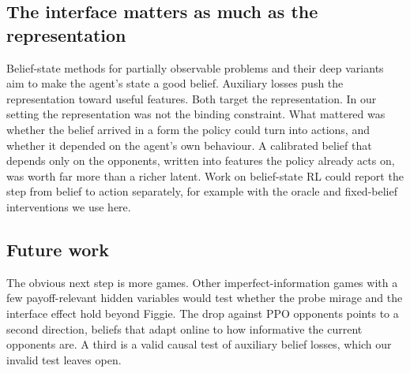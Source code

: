 \documentclass{article}
\begin{document}
\subsection{The interface matters as much as the representation}
Belief-state methods for partially observable problems \cite{kaelbling1998pomdp} and their deep variants \cite{hausknecht2015drqn,igl2018dvrl} aim to make the agent's state a good belief. Auxiliary losses \cite{jaderberg2017unreal} push the representation toward useful features. Both target the representation. In our setting the representation was not the binding constraint. What mattered was whether the belief arrived in a form the policy could turn into actions, and whether it depended on the agent's own behaviour. A calibrated belief that depends only on the opponents, written into features the policy already acts on, was worth far more than a richer latent. Work on belief-state RL could report the step from belief to action separately, for example with the oracle and fixed-belief interventions we use here.

\subsection{Future work}
The obvious next step is more games. Other imperfect-information games with a few payoff-relevant hidden variables would test whether the probe mirage and the interface effect hold beyond Figgie. The drop against PPO opponents points to a second direction, beliefs that adapt online to how informative the current opponents are. A third is a valid causal test of auxiliary belief losses, which our invalid test leaves open.
\end{document}
